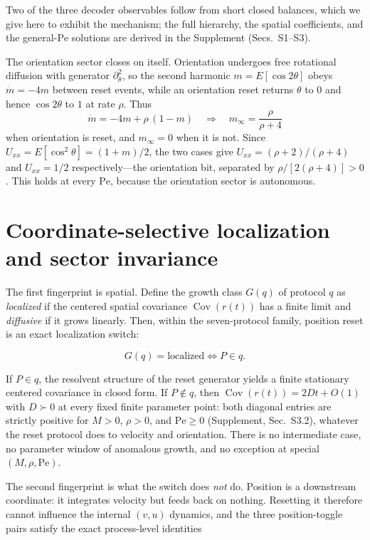 Two of the three decoder observables follow from short closed balances, which we give here to exhibit the mechanism; the full hierarchy, the spatial coefficients, and the general-$\mathrm{Pe}$ solutions are derived in the Supplement (Secs.~S1--S3).

The orientation sector closes on itself. Orientation undergoes free rotational diffusion with generator $\partial_\theta^2$, so the second harmonic $m=E[\cos2\theta]$ obeys $\dot m=-4m$ between reset events, while an orientation reset returns $\theta$ to $0$ and hence $\cos2\theta$ to $1$ at rate $\rho$. Thus
\[
\dot m=-4m+\rho\,(1-m)
\quad\Rightarrow\quad
m_\infty=\frac{\rho}{\rho+4}
\]
when orientation is reset, and $m_\infty=0$ when it is not. Since $U_{xx}=E[\cos^2\theta]=(1+m)/2$, the two cases give $U_{xx}=(\rho+2)/(\rho+4)$ and $U_{xx}=1/2$ respectively---the orientation bit, separated by $\rho/[2(\rho+4)]>0$. This holds at every $\mathrm{Pe}$, because the orientation sector is autonomous.

\section{Coordinate-selective localization and sector invariance}\label{localization-sector-invariance}

The first fingerprint is spatial. Define the growth class $G(q)$ of protocol $q$ as \emph{localized} if the centered spatial covariance $\operatorname{Cov}(r(t))$ has a finite limit and \emph{diffusive} if it grows linearly. Then, within the seven-protocol family, position reset is an exact localization switch:

\[
G(q)=\text{localized}\iff P\in q .
\]

If $P\in q$, the resolvent structure of the reset generator yields a finite stationary centered covariance in closed form. If $P\notin q$, then $\operatorname{Cov}(r(t))=2Dt+O(1)$ with $D\succ0$ at every fixed finite parameter point: both diagonal entries are strictly positive for $M>0$, $\rho>0$, and $\mathrm{Pe}\ge0$ (Supplement, Sec.~S3.2), whatever the reset protocol does to velocity and orientation. There is no intermediate case, no parameter window of anomalous growth, and no exception at special $(M,\rho,\mathrm{Pe})$.

The second fingerprint is what the switch does \emph{not} do. Position is a downstream coordinate: it integrates velocity but feeds back on nothing. Resetting it therefore cannot influence the internal $(v,u)$ dynamics, and the three position-toggle pairs satisfy the exact process-level identities

